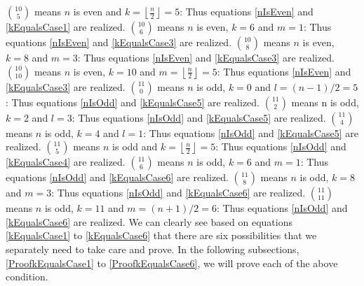 \documentclass[10pt, twoside]{article}
\newcommand*{\Combination}[2]{\binom{#1}{#2}}%
\newcommand{\floordivision}[2]{\left\lfloor \frac{#1}{#2} \right\rfloor}
\begin{document}
$\Combination{10}{5}$ means $n$ is even and $k = \floordivision{n}{2} = 5$: Thus equations \eqref{nIsEven} and \eqref{kEqualsCase1} are realized.\newline\newline
$\Combination{10}{6}$ means $n$ is even, $k = 6$ and $m=1$: Thus equations \eqref{nIsEven} and \eqref{kEqualsCase3} are realized.\newline\newline
$\Combination{10}{8}$ means $n$ is even, $k = 8$ and $m=3$: Thus equations \eqref{nIsEven} and \eqref{kEqualsCase3} are realized.\newline\newline
$\Combination{10}{10}$ means $n$ is even, $k = 10$ and $m= \floordivision{n}{2}=5$: Thus equations \eqref{nIsEven} and \eqref{kEqualsCase3} are realized.\newline\newline
$\Combination{11}{0}$ means $n$ is odd, $k = 0$ and $l=(n-1)/2=5$: Thus equations \eqref{nIsOdd} and \eqref{kEqualsCase5} are realized.\newline\newline
$\Combination{11}{2}$ means n is odd, $k = 2$ and $l=3$: Thus equations \eqref{nIsOdd} and \eqref{kEqualsCase5} are realized.\newline\newline
$\Combination{11}{4}$ means $n$ is odd, $k = 4$ and $l=1$: Thus equations \eqref{nIsOdd} and \eqref{kEqualsCase5} are realized.\newline\newline
$\Combination{11}{5}$ means $n$ is odd and $k = \floordivision{n}{2} = 5$: Thus equations \eqref{nIsOdd} and \eqref{kEqualsCase4} are realized.\newline\newline
$\Combination{11}{6}$ means $n$ is odd, $k = 6$ and $m=1$: Thus equations \eqref{nIsOdd} and \eqref{kEqualsCase6} are realized.\newline\newline
$\Combination{11}{8}$ means $n$ is odd, $k = 8$ and $m=3$: Thus equations \eqref{nIsOdd} and \eqref{kEqualsCase6} are realized.\newline\newline
$\Combination{11}{11}$ means $n$ is odd, $k = 11$ and $m= (n+1)/2=6$: Thus equations \eqref{nIsOdd} and \eqref{kEqualsCase6} are realized.\newline\newline
We can clearly see based on equations \eqref{kEqualsCase1} to \eqref{kEqualsCase6} that there are six possibilities that we separately need to take care and prove. In the following subsections, \ref{ProofkEqualsCase1} to \ref{ProofkEqualsCase6}, we will prove each of the above condition.
\end{document}
